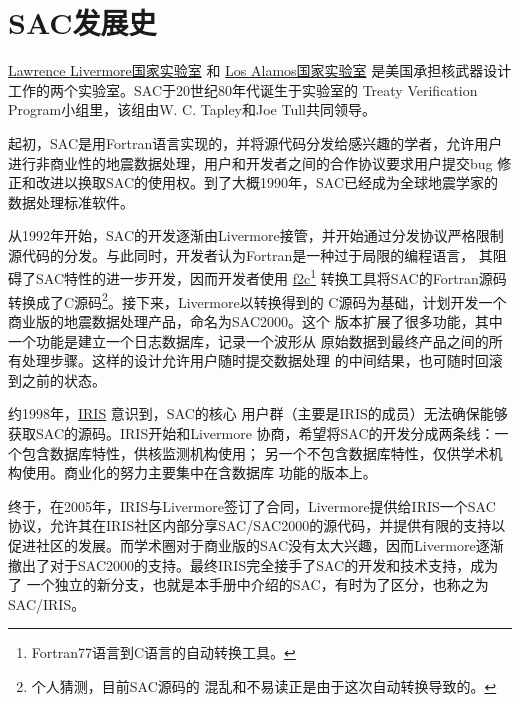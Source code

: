 \section{SAC发展史}
\label{sec:history}

\href{http://en.wikipedia.org/wiki/Lawrence\_Livermore\_National\_Laboratory}{Lawrence Livermore国家实验室}
和 \href{http://en.wikipedia.org/wiki/Los\_Alamos\_National\_Laboratory}{Los Alamos国家实验室}
是美国承担核武器设计工作的两个实验室。SAC于20世纪80年代诞生于实验室的
Treaty Verification Program小组里，该组由W. C. Tapley和Joe Tull共同领导。

起初，SAC是用Fortran语言实现的，并将源代码分发给感兴趣的学者，允许用户
进行非商业性的地震数据处理，用户和开发者之间的合作协议要求用户提交bug
修正和改进以换取SAC的使用权。到了大概1990年，SAC已经成为全球地震学家的
数据处理标准软件。

从1992年开始，SAC的开发逐渐由Livermore接管，并开始通过分发协议严格限制
源代码的分发。与此同时，开发者认为Fortran是一种过于局限的编程语言，
其阻碍了SAC特性的进一步开发，因而开发者使用
\href{http://www.netlib.org/f2c/}{f2c}\footnote{Fortran77语言到C语言的自动转换工具。}
转换工具将SAC的Fortran源码转换成了C源码\footnote{个人猜测，目前SAC源码的
混乱和不易读正是由于这次自动转换导致的。}。接下来，Livermore以转换得到的
C源码为基础，计划开发一个商业版的地震数据处理产品，命名为SAC2000。这个
版本扩展了很多功能，其中一个功能是建立一个日志数据库，记录一个波形从
原始数据到最终产品之间的所有处理步骤。这样的设计允许用户随时提交数据处理
的中间结果，也可随时回滚到之前的状态。

约1998年，\href{http://www.iris.edu}{IRIS} 意识到，SAC的核心
用户群（主要是IRIS的成员）无法确保能够获取SAC的源码。IRIS开始和Livermore
协商，希望将SAC的开发分成两条线：一个包含数据库特性，供核监测机构使用；
另一个不包含数据库特性，仅供学术机构使用。商业化的努力主要集中在含数据库
功能的版本上。

终于，在2005年，IRIS与Livermore签订了合同，Livermore提供给IRIS一个SAC
协议，允许其在IRIS社区内部分享SAC/SAC2000的源代码，并提供有限的支持以
促进社区的发展。而学术圈对于商业版的SAC没有太大兴趣，因而Livermore逐渐
撤出了对于SAC2000的支持。最终IRIS完全接手了SAC的开发和技术支持，成为了
一个独立的新分支，也就是本手册中介绍的SAC，有时为了区分，也称之为
SAC/IRIS。
